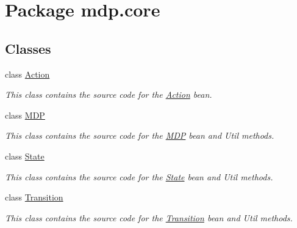 \hypertarget{namespacemdp_1_1core}{}\section{Package mdp.\+core}
\label{namespacemdp_1_1core}
\subsection*{Classes}
\begin{DoxyCompactItemize}
\item 
class \hyperlink{classmdp_1_1core_1_1_action}{Action}
\begin{DoxyCompactList}\small\item\em This class contains the source code for the \hyperlink{classmdp_1_1core_1_1_action}{Action} bean. \end{DoxyCompactList}\item 
class \hyperlink{classmdp_1_1core_1_1_m_d_p}{M\+D\+P}
\begin{DoxyCompactList}\small\item\em This class contains the source code for the \hyperlink{classmdp_1_1core_1_1_m_d_p}{M\+D\+P} bean and Util methods. \end{DoxyCompactList}\item 
class \hyperlink{classmdp_1_1core_1_1_state}{State}
\begin{DoxyCompactList}\small\item\em This class contains the source code for the \hyperlink{classmdp_1_1core_1_1_state}{State} bean and Util methods. \end{DoxyCompactList}\item 
class \hyperlink{classmdp_1_1core_1_1_transition}{Transition}
\begin{DoxyCompactList}\small\item\em This class contains the source code for the \hyperlink{classmdp_1_1core_1_1_transition}{Transition} bean and Util methods. \end{DoxyCompactList}\end{DoxyCompactItemize}
